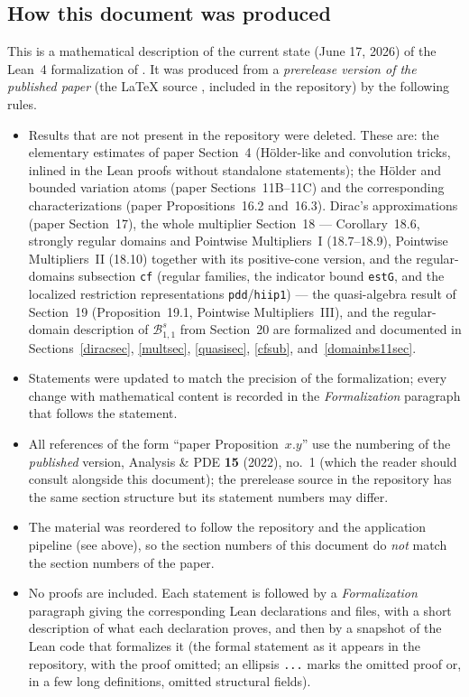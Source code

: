 \documentclass[11pt]{amsart}
\theoremstyle{definition}
\newcommand{\SB}{{\mathcal B}}
\newcommand{\lean}[1]{\ifmmode\mbox{\leanname{#1}}\else\hspace{0pt}\leanname{#1}\fi}
\begin{document}
\subsection{How this document was produced}

This is a mathematical description of the current state (June 17, 2026) of the
Lean~4 formalization of \cite{paper}. It was produced from a \emph{prerelease
version of the published paper} (the LaTeX source
\lean{preprint-source/besovish-2020-07-18.tex}, included in the repository)
by the following rules.

\begin{itemize}
\item Results that are not present in the repository were deleted. These are:
  the elementary estimates of paper Section~4 (H\"older-like and convolution
  tricks, inlined in the Lean proofs without standalone statements); the
  H\"older and bounded variation atoms (paper Sections~11B--11C) and the
  corresponding characterizations (paper Propositions~16.2 and~16.3). Dirac's
  approximations (paper Section~17), the whole multiplier Section~18 ---
  Corollary~18.6,
  strongly regular domains and Pointwise Multipliers~I (18.7--18.9),
  Pointwise Multipliers~II (18.10) together with its positive-cone version,
  and the regular-domains subsection \texttt{cf} (regular families, the
  indicator bound \texttt{estG}, and the localized restriction representations
  \texttt{pdd}/\texttt{hiip1}) --- the quasi-algebra result of Section~19
  (Proposition~19.1, Pointwise Multipliers~III), and the regular-domain
  description of $\SB^s_{1,1}$ from Section~20 are formalized and documented
  in Sections~\ref{diracsec}, \ref{multsec}, \ref{quasisec}, \ref{cfsub},
  and~\ref{domainbs11sec}.
\item Statements were updated to match the precision of the formalization;
  every change with mathematical content is recorded in the
  \emph{Formalization} paragraph that follows the statement.
\item All references of the form ``paper Proposition~$x.y$'' use the
  numbering of the \emph{published} version, Analysis \& PDE \textbf{15}
  (2022), no.~1 (which the reader should consult alongside this document);
  the prerelease source in the repository has the same section structure but
  its statement numbers may differ.
\item The material was reordered to follow the repository and the application
  pipeline (see above), so the section numbers of this document do
  \emph{not} match the section numbers of the paper.
\item No proofs are included. Each statement is followed by a
  \emph{Formalization} paragraph giving the corresponding Lean declarations
  and files, with a short description of what each declaration proves, and
  then by a snapshot of the Lean code that formalizes it (the formal
  statement as it appears in the repository, with the proof omitted; an
  ellipsis \texttt{...} marks the omitted proof or, in a few long
  definitions, omitted structural fields).
\end{itemize}
\end{document}
